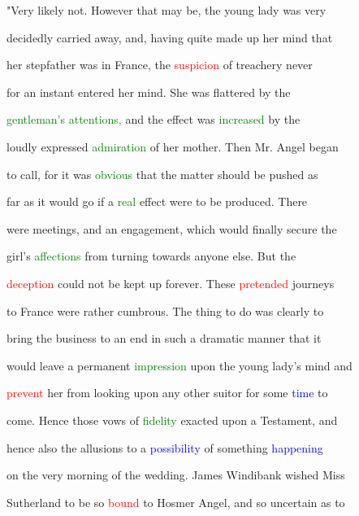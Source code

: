  "Very likely not. However that may be, the \textcolor{BurntOrange}{young} lady was very

 decidedly carried away, and, having quite made up her mind that

 her stepfather was in France, the \textcolor{red}{suspicion} of \textcolor{BurntOrange}{treachery} never

 for an instant entered her mind. She was flattered by the

 \textcolor{green}{gentleman's} \textcolor{green}{attentions,} and the effect was \textcolor{green}{increased} by the

 loudly expressed \textcolor{green}{admiration} of her \textcolor{BurntOrange}{mother.} Then Mr. \textcolor{BurntOrange}{Angel} began

 to call, for it was \textcolor{green}{obvious} that the matter should be pushed as

 far as it would go if a \textcolor{green}{real} effect were to be produced. There

 were meetings, and an engagement, which would \textcolor{BurntOrange}{finally} secure the

 girl's \textcolor{green}{affections} from turning towards anyone else. But the

 \textcolor{red}{deception} could not be kept up forever. These \textcolor{red}{pretended} \textcolor{BurntOrange}{journeys}

 to France were rather cumbrous. The thing to do was clearly to

 bring the business to an end in such a dramatic manner that it

 would \textcolor{BurntOrange}{leave} a permanent \textcolor{green}{impression} upon the \textcolor{BurntOrange}{young} lady's mind and

 \textcolor{red}{prevent} her from looking upon any other suitor for some \textcolor{blue}{time} to

 come. Hence those \textcolor{BurntOrange}{vows} of \textcolor{green}{fidelity} exacted upon a \textcolor{BurntOrange}{Testament,} and

 hence also the allusions to a \textcolor{blue}{possibility} of something \textcolor{blue}{happening}

 on the very morning of the wedding. James Windibank wished Miss

 Sutherland to be so \textcolor{red}{bound} to Hosmer \textcolor{BurntOrange}{Angel,} and so \textcolor{BurntOrange}{uncertain} as to

